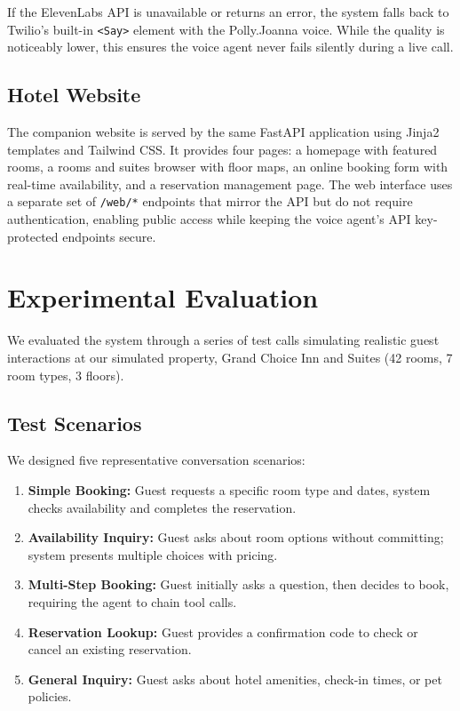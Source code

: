 \documentclass[conference]{IEEEtran}
\begin{document}
If the ElevenLabs API is unavailable or returns an error, the system falls back to Twilio's built-in \texttt{<Say>} element with the Polly.Joanna voice. While the quality is noticeably lower, this ensures the voice agent never fails silently during a live call.

\subsection{Hotel Website}

The companion website is served by the same FastAPI application using Jinja2 templates and Tailwind CSS. It provides four pages: a homepage with featured rooms, a rooms and suites browser with floor maps, an online booking form with real-time availability, and a reservation management page. The web interface uses a separate set of \texttt{/web/*} endpoints that mirror the API but do not require authentication, enabling public access while keeping the voice agent's API key-protected endpoints secure.

\section{Experimental Evaluation}

We evaluated the system through a series of test calls simulating realistic guest interactions at our simulated property, Grand Choice Inn and Suites (42 rooms, 7 room types, 3 floors).

\subsection{Test Scenarios}

We designed five representative conversation scenarios:

\begin{enumerate}
    \item \textbf{Simple Booking:} Guest requests a specific room type and dates, system checks availability and completes the reservation.
    \item \textbf{Availability Inquiry:} Guest asks about room options without committing; system presents multiple choices with pricing.
    \item \textbf{Multi-Step Booking:} Guest initially asks a question, then decides to book, requiring the agent to chain tool calls.
    \item \textbf{Reservation Lookup:} Guest provides a confirmation code to check or cancel an existing reservation.
    \item \textbf{General Inquiry:} Guest asks about hotel amenities, check-in times, or pet policies.
\end{enumerate}
\end{document}
